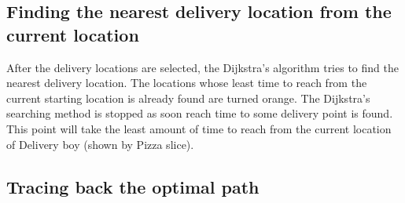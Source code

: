 \documentclass{article}
\begin{document}
\subsection{Finding the nearest delivery location from the current location}
After the delivery locations are selected, the Dijkstra's algorithm tries to find the nearest delivery location. The locations whose least time to reach from the current starting location is already found are turned orange. The Dijkstra's searching method is stopped as soon reach time to some delivery point is found. This point will take the least amount of time to reach from the current location of Delivery boy (shown by Pizza slice).
\begin{figure}[H]
     \centering
\end{figure}

\subsection{Tracing back the optimal path}
\end{document}
